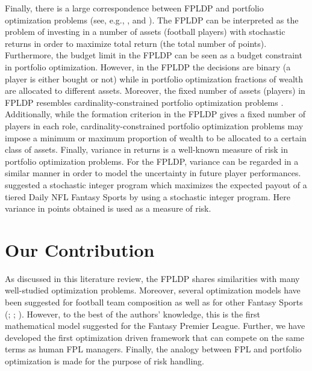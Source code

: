 \newpar

Finally, there is a large correspondence between FPLDP and portfolio optimization problems (see, e.g., \cite{Markowitz}, \cite{Zenios} and \cite{Speranza}). The FPLDP can be interpreted as the problem of investing in a number of assets (football players) with stochastic returns in order to maximize total return (the total number of points). Furthermore, the budget limit in the FPLDP can be seen as a budget constraint in portfolio optimization. However, in the FPLDP the decisions are binary (a player is either bought or not) while in portfolio optimization fractions of wealth are allocated to different assets. Moreover, the fixed number of assets (players) in FPLDP resembles cardinality-constrained portfolio optimization problems \citep{Chang}. Additionally, while the formation criterion in the FPLDP gives a fixed number of players in each role, cardinality-constrained portfolio optimization problems may impose a minimum or maximum proportion of wealth to be allocated to a certain class of assets. Finally, variance in returns is a well-known measure of risk in portfolio optimization problems. For the FPLDP, variance can be regarded in a similar manner in order to model the uncertainty in future player performances. \cite{Dailyfantasysports} suggested a stochastic integer program which maximizes the expected payout of a tiered Daily NFL Fantasy Sports by using a stochastic integer program. Here variance in points obtained is used as a measure of risk.



\section{Our Contribution}

As discussed in this literature review, the FPLDP shares similarities with many well-studied optimization problems. Moreover, several optimization models have been suggested for football team composition as well as for other Fantasy Sports (\cite{Fry}; \cite{Gibson}; \cite{Becker}). However, to the best of the authors' knowledge, this is the first mathematical model suggested for the Fantasy Premier League. Further, we have developed the first optimization driven framework that can compete on the same terms as human FPL managers. Finally, the analogy between FPL and portfolio optimization is made for the purpose of risk handling.